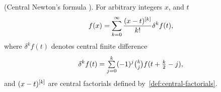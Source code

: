 \begin{proposition}
  {\normalfont
  (Central Newton's formula \cite[p.~462]{butzer1989central}).}
  For arbitrary integers $x$, and $t$
  \label{prop:newtons-interpolation-formula-in-central-differences}
  \begin{align*}
    f(x)
    = \sum_{k=0}^{\infty} \frac{(x-t)^{[k]}}{k!} \delta^{k} f(t),
  \end{align*}
  where $\delta^{k} f(t)$ denotes central finite difference
  \begin{align*}
    \delta^{k} f(t) = \mathop{\textstyle\sum}_{j=0}^{k} (-1)^j \tbinom{k}{j} f(t+\tfrac{k}{2} - j),
  \end{align*}
  and $(x-t)^{[k]}$ are central factorials
  defined by~\eqref{def:central-factorials}.
\end{proposition}
